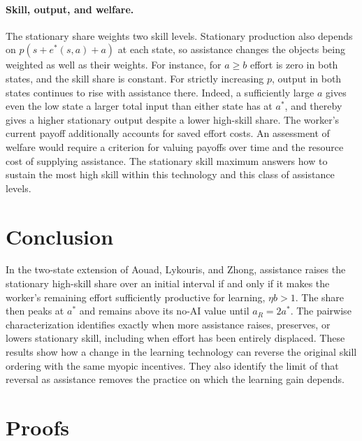 \documentclass[11pt]{article}
\theoremstyle{definition}
\begin{document}
\paragraph{Skill, output, and welfare.}
The stationary share weights two skill levels. Stationary production
also depends on $p(s+e^*(s,a)+a)$ at each state, so assistance changes the
objects being weighted as well as their weights. For instance, for $a\ge b$
effort is zero in both states, and the skill share is constant. For
strictly increasing $p$, output in both states continues to rise with
assistance there. Indeed, a sufficiently large $a$ gives even the low
state a larger total input than either state has at $a^*$, and thereby
gives a higher stationary output despite a lower high-skill share.
The worker's current payoff additionally accounts for saved effort costs.
An assessment of welfare would require a criterion for valuing payoffs
over time and the resource cost of supplying assistance. The stationary
skill maximum answers how to sustain the most high skill within this
technology and this class of assistance levels.

\section{Conclusion}\label{sec:conclusion}
In the two-state extension of Aouad, Lykouris, and Zhong, assistance
raises the stationary high-skill share over an initial interval if and
only if it makes the worker's remaining effort sufficiently productive
for learning, $\eta b>1$. The share then peaks at $a^*$ and remains above
its no-AI value until $a_R=2a^*$. The pairwise characterization identifies
exactly when more assistance raises, preserves, or lowers stationary
skill, including when effort has been entirely displaced. These results
show how a change in the learning technology can reverse the original
skill ordering with the same myopic incentives. They also identify the
limit of that reversal as assistance removes the practice on which the
learning gain depends.

\clearpage


\clearpage
\appendix
{}
\section{Proofs}\label{app:proofs}
\end{document}

